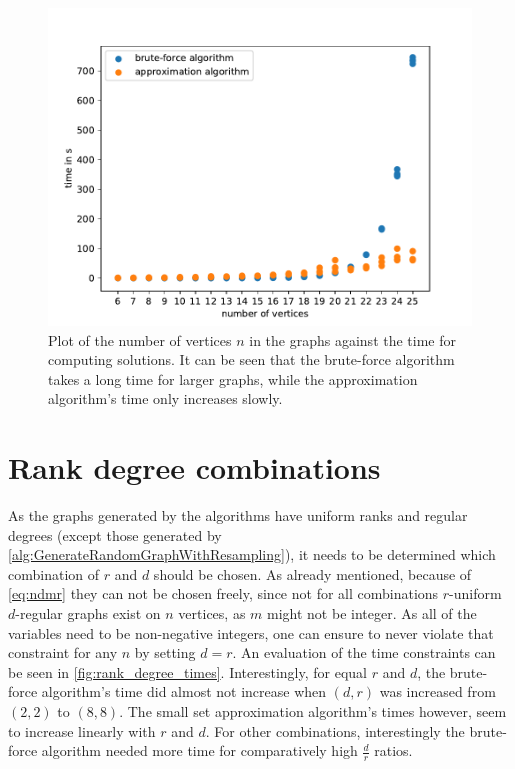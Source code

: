 \begin{figure}[htpb]
	\centering
	\includegraphics[scale=0.8]{figures/number_vertices_all_logs.pdf}
	\caption[Plot graph size against time]{Plot of the number of vertices $n$ in the graphs against the time for computing solutions. It can be seen that the brute-force algorithm takes a long time for larger graphs, while the approximation algorithm's time only increases slowly.\label{fig:no_vertices_time}}
\end{figure}


\section{Rank degree combinations}

As the graphs generated by the algorithms have uniform ranks and  regular degrees (except those generated by \cref{alg:GenerateRandomGraphWithResampling}), it needs to be determined which combination of $r$ and $d$ should be chosen. As already mentioned, because of \cref{eq:ndmr} they can not be chosen freely, since not for all combinations $r$-uniform $d$-regular graphs exist on $n$ vertices, as $m$ might not be integer. 
As all of the variables need to be non-negative integers, one can ensure to never violate that constraint for any $n$ by setting $d=r$. An evaluation of the time constraints can be seen in \cref{fig:rank_degree_times}. Interestingly, for equal $r$ and $d$, the brute-force algorithm's time did almost not increase when $(d,r)$ was increased from $(2,2)$ to $(8,8)$. The small set approximation algorithm's times however, seem to increase linearly with $r$ and $d$. For other combinations, interestingly the brute-force algorithm needed more time for comparatively high $\frac{d	}{r}$ ratios.

